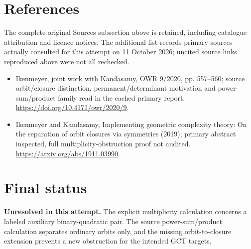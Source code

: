 \documentclass[11pt]{article}
\begin{document}
\section{References}
The complete original Sources subsection above is retained, including catalogue attribution and licence notices. The additional list records primary sources actually consulted for this attempt on 11 October 2026; uncited source links reproduced above were not all rechecked.
\begin{itemize}
\item Ikenmeyer, joint work with Kandasamy, OWR 9/2020, pp. 557--560; source orbit/closure distinction, permanent/determinant motivation and power-sum/product family read in the cached primary report. \url{https://doi.org/10.4171/owr/2020/9}.
\item Ikenmeyer and Kandasamy, Implementing geometric complexity theory: On the separation of orbit closures via symmetries (2019); primary abstract inspected, full multiplicity-obstruction proof not audited. \url{https://arxiv.org/abs/1911.03990}.
\end{itemize}
\section{Final status}
\textbf{Unresolved in this attempt.} The explicit multiplicity calculation concerns a labeled auxiliary binary-quadratic pair. The source power-sum/product calculation separates ordinary orbits only, and the missing orbit-to-closure extension prevents a new obstruction for the intended GCT targets.
\end{document}
